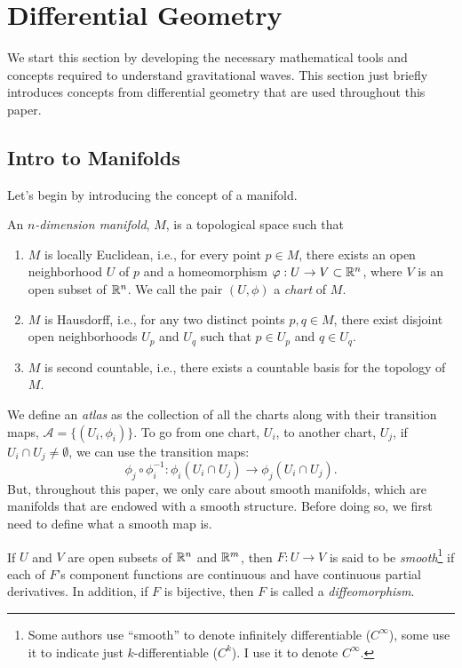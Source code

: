 \section{Differential Geometry}
\label{sec:differential_geometry}

We start this section by developing the necessary mathematical tools and concepts required to understand gravitational waves. This section just briefly introduces concepts from differential geometry that are used throughout this paper.

\subsection{Intro to Manifolds} Let's begin by introducing the concept of a manifold.

\begin{definition}
  An \emph{$n$-dimension manifold}, $M$, is a topological space such that
  \begin{enumerate}
    \item $M$ is locally Euclidean, i.e., for every point $p \in M$, there exists an open neighborhood $U$ of $p$ and a homeomorphism $\varphi : U \rightarrow V \subset \mathbb{R}^n$, where $V$ is an open subset of $\mathbb{R}^n$. We call the pair $(U, \phi)$ a \emph{chart} of $M$.
    \item $M$ is Hausdorff, i.e., for any two distinct points $p, q \in M$, there exist disjoint open neighborhoods $U_p$ and $U_q$ such that $p \in U_p$ and $q \in U_q$.
    \item $M$ is second countable, i.e., there exists a countable basis for the topology of $M$.
  \end{enumerate}
\end{definition}

We define an \textit{atlas} as the collection of all the charts along with their transition maps, $\mathcal{A} = \{(U_i, \phi_i)\}$. To go from one chart, $U_i$, to another chart, $U_j$, if $U_i \cap U_j \ne \emptyset$, we can use the transition maps:
\[%
  \phi_j \circ \phi_i^{-1} : \phi_i(U_i \cap U_j) \to \phi_j(U_i \cap U_j)
.\]%
But, throughout this paper, we only care about smooth manifolds, which are manifolds that are endowed with a smooth structure. Before doing so, we first need to define what a smooth map is.


\begin{definition}
  If $U$ and $V$ are open subsets of $\mathbb{R}^n$ and $\mathbb{R}^m$, then $F : U \to V$ is said to be \emph{smooth}\footnote{Some authors use ``smooth'' to denote infinitely differentiable ($C^\infty$), some use it to indicate just $k$-differentiable ($C^k$). I use it to denote $C^\infty$.} if each of $F$'s component functions are continuous and have continuous partial derivatives. In addition, if $F$ is bijective, then $F$ is called a \emph{diffeomorphism}.
\end{definition}

